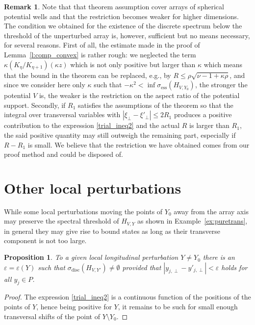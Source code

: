 \documentclass{article}
\numberwithin{equation}{section}
\newtheorem{proposition}[theorem]{Proposition}
\theoremstyle{definition}
\newtheorem{remark}[theorem]{Remark}
\begin{document}
\begin{remark}
Note that that theorem assumption cover arrays of spherical potential wells and that the restriction becomes weaker for higher dimensions. The condition we obtained for the existence of the discrete spectrum below the threshold of the unperturbed array is, however, sufficient but no means necessary, for several reasons. First of all, the estimate made in the proof of Lemma~\ref{l:comp_convex} is rather rough: we neglected the term $\kappa(K_\eta/K_{\eta+1})(\kappa z)$ which is not only positive but larger than $\kappa$ which means that the bound in the theorem can be replaced, e.g., by $R\le \rho\sqrt{\nu-1+\kappa\rho}$, and since we consider here only $\kappa$ such that $-\kappa^2< \inf\sigma_\mathrm{ess}(H_{V,Y_0})$, the stronger the potential $V$ is, the weaker is the restriction on the aspect ratio of the potential support. Secondly, if $R_1$ satisfies the assumptions of the theorem so that the integral over transversal variables with $|\xi_\perp- \xi'_\perp| \le 2R_1$ produces a positive contribution to the expression \eqref{trial_ineq2} and the actual $R$ is larger than $R_1$, the said positive quantity may still outweigh the remaining part, especially if $R-R_1$ is small. We believe that the restriction we have obtained comes from our proof method and could be disposed of.
\end{remark}

\section{Other local perturbations}
\label{s:other}

While some local perturbations moving the points of $Y_0$ away from the array axis may preserve the spectral threshold of $H_{V,Y}$ as shown in Example~\ref{ex:puretrans}, in general they may give rise to bound states as long as their transverse component is not too large.
 \begin{proposition} \label{prop:skew}
To a given local longitudinal perturbation $Y\ne Y_0$ there is an $\varepsilon=\varepsilon(Y)$ such that $\sigma_\mathrm{disc}(H_{V,Y'})\ne\emptyset$ provided that $|y_{j,\perp} -y'_{j,\perp}|<\varepsilon$ holds for all $y_j\in P$.
 \end{proposition}
\begin{proof}
The expression \eqref{trial_ineq2} is a continuous function of the positions of the points of $Y$, hence being positive for $Y$, it remains to be such for small enough transversal shifts of the point of $Y\setminus Y_0$.
\end{proof}
\end{document}
